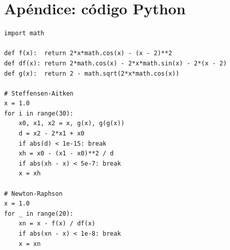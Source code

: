\documentclass[12pt,a4paper]{article}
\begin{document}
\section*{Ap\'endice: c\'odigo Python}

\begin{lstlisting}[caption={Steffensen-Aitken y Newton-Raphson para f(x)}]
import math

def f(x):  return 2*x*math.cos(x) - (x - 2)**2
def df(x): return 2*math.cos(x) - 2*x*math.sin(x) - 2*(x - 2)
def g(x):  return 2 - math.sqrt(2*x*math.cos(x))

# Steffensen-Aitken
x = 1.0
for i in range(30):
    x0, x1, x2 = x, g(x), g(g(x))
    d = x2 - 2*x1 + x0
    if abs(d) < 1e-15: break
    xh = x0 - (x1 - x0)**2 / d
    if abs(xh - x) < 5e-7: break
    x = xh

# Newton-Raphson
x = 1.0
for _ in range(20):
    xn = x - f(x) / df(x)
    if abs(xn - x) < 1e-8: break
    x = xn
\end{lstlisting}
\end{document}

